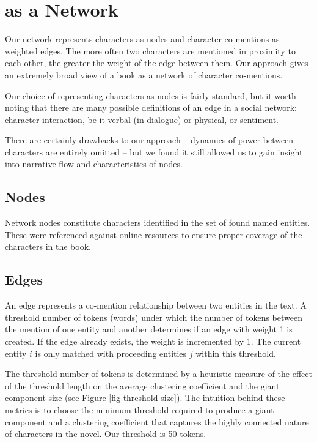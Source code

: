 \section{\infinitejest as a Network}

Our network represents characters as nodes and character co-mentions as weighted edges. The more often two characters are mentioned in proximity to each other, the greater the weight of the edge between them. Our approach gives an extremely broad view of a book as a network of character co-mentions.

Our choice of representing characters as nodes is fairly standard, but it worth noting that there are many possible definitions of an edge in a social network: character interaction, be it verbal (in dialogue) or physical, or sentiment. 

There are certainly drawbacks to our approach -- dynamics of power between characters are entirely omitted -- but we found it still allowed us to gain insight into narrative flow and characteristics of nodes.

\subsection{Nodes}
Network nodes constitute characters identified in the set of found named entities. These were referenced against online resources to ensure proper coverage of the characters in the book.\cite{david_foster_wallace_wiki}

\subsection{Edges}
An edge represents a co-mention relationship between two entities in the text. A threshold number of tokens (words) under which the number of tokens between the mention of one entity and another determines if an edge with weight 1 is created. If the edge already exists, the weight is incremented by 1. The current entity $i$ is only matched with proceeding entities $j$ within this threshold.

The threshold number of tokens is determined by a heuristic measure of the effect of the threshold length on the average clustering coefficient and the giant component size (see Figure \ref{fig-threshold-size}). The intuition behind these metrics is to choose the minimum threshold required to produce a giant component and a clustering coefficient that captures the highly connected nature of characters in the novel. Our threshold is 50 tokens.

